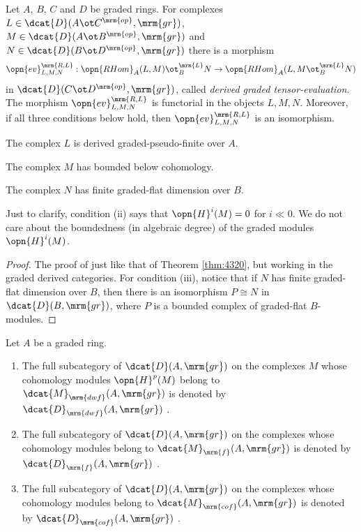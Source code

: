 \begin{thm} \label{thm:4535}  
Let $A$, $B$, $C$ and $D$ be graded rings. For complexes 
$L \in \dcat{D}(A \ot C^{\mrm{op}}, \mrm{gr})$,
$M \in \dcat{D}(A \ot B^{\mrm{op}}, \mrm{gr})$ and 
$N \in \dcat{D}(B \ot D^{\mrm{op}}, \mrm{gr})$
there is a morphism 
\[ \opn{ev}^{\mrm{R, L}}_{L, M, N} :
\opn{RHom}_A(L, M) \ot_B^{\mrm{L}} N \to 
\opn{RHom}_A(L, M \ot_B^{\mrm{L}} N) \]
in $\dcat{D}(C \ot D^{\mrm{op}}, \mrm{gr})$, called 
{\em derived graded tensor-evaluation}.  
The morphism $\opn{ev}^{\mrm{R, L}}_{L, M, N}$ 
is functorial in the objects $L, M, N$.
Moreover, if all three conditions below hold, then 
$\opn{ev}^{\mrm{R, L}}_{L, M, N}$ is an isomorphism. 
\begin{enumerate}
 The complex $L$ is derived graded-pseudo-finite over $A$.

 The complex $M$ has bounded below cohomology. 

 The complex $N$ has finite graded-flat dimension over $B$. 
\end{enumerate}
\end{thm}

Just to clarify, condition (ii) says that $\opn{H}^i(M) = 0$ for $i \ll 0$. 
We do not care about the boundedness (in algebraic degree) of the graded 
modules $\opn{H}^i(M)$. 

\begin{proof}
The proof of just like that of Theorem \ref{thm:4320}, but 
working in the graded derived categories. For condition (iii), notice 
that if $N$ has finite graded-flat dimension over $B$, then there is an 
isomorphism $P \cong N$ in $\dcat{D}(B, \mrm{gr})$, where $P$ is a bounded 
complex of graded-flat $B$-modules.
\end{proof}

\begin{dfn} \label{dfn:3732} 
Let $A$ be a graded ring. 
\begin{enumerate}
\item The full subcategory of $\dcat{D}(A, \mrm{gr})$ on the complexes $M$ 
whose cohomology modules $\opn{H}^p(M)$ belong to 
$\dcat{M}_{\mrm{dwf}}(A, \mrm{gr})$
is denoted by $\dcat{D}_{\mrm{dwf}}(A, \mrm{gr})$%
.

\item The full subcategory of $\dcat{D}(A, \mrm{gr})$ on the complexes 
whose cohomology modules belong to 
$\dcat{M}_{\mrm{f}}(A, \mrm{gr})$
is denoted by $\dcat{D}_{\mrm{f}}(A, \mrm{gr})$%
.

\item The full subcategory of $\dcat{D}(A, \mrm{gr})$ on the complexes 
whose cohomology modules belong to 
$\dcat{M}_{\mrm{cof}}(A, \mrm{gr})$
is denoted by $\dcat{D}_{\mrm{cof}}(A, \mrm{gr})$%
.
\end{enumerate}
\end{dfn}

